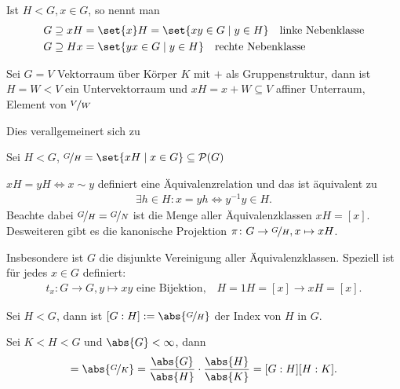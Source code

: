 \begin{definition}
	Ist $H < G, x \in G$, so nennt man
	\begin{align*}
	G \supseteq x H &= \set{x}H = \set{xy \in G \mid y \in H} \quad \text{linke Nebenklasse}\\
	G \supseteq H x &= \set{yx \in G \mid y \in H} \quad \text{rechte Nebenklasse}
	\end{align*}
\end{definition}
\begin{example}
	Sei $G = V$ Vektorraum über Körper $K$ mit $+$ als Gruppenstruktur, dann ist $H = W < V$ ein Untervektorraum und $xH = x + W \subseteq V$ affiner Unterraum, Element von $\lnkset{V}{W}$
\end{example}
Dies verallgemeinert sich zu
\begin{definition}
	Sei $H < G$, $\lnkset{G}{H} = \set{x H \mid x \in G} \subseteq \powerset(G)$
\end{definition}
\begin{remark}
	$xH = yH \Leftrightarrow x \sim y$ definiert eine Äquivalenzrelation und das ist äquivalent zu
	\begin{align*}
		\exists h \in H: x = yh \Leftrightarrow y^{-1}y \in H.
	\end{align*}
	Beachte dabei $\lnkset{G}{H} = \lnkset{G}{N}$ ist die Menge aller Äquivalenzklassen $xH = [x]$. Desweiteren gibt es die kanonische Projektion $\pi\colon G \to \lnkset{G}{H},x \mapsto xH$.
	
	Insbesondere ist $G$ die disjunkte Vereinigung aller Äquivalenzklassen. Speziell ist für jedes $x \in G$ definiert:
	\begin{align*}
		t_x\colon G \to G, y \mapsto xy \text{ eine Bijektion,} \quad H = 1H = [x] \to xH = [x].
	\end{align*}
\end{remark}

\begin{definition}[Index]
	Sei $H < G$, dann ist $[G:H] := \abs{\lnkset{G}{H}}$ der Index von $H$ in $G$.
\end{definition}

\begin{conclusion}
	Sei $K < H < G$ und $\abs{G} < \infty$, dann
	\begin{align*}
	[G:K] = \abs{\lnkset{G}{K}} = \frac{\abs{G}}{\abs{H}}\cdot \frac{\abs{H}}{\abs{K}} = [G:H][H:K].
	\end{align*}
\end{conclusion}

